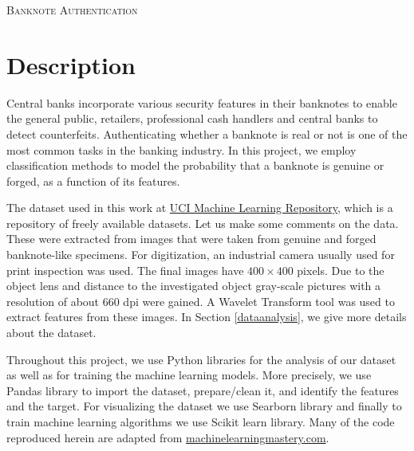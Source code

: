 \documentclass[a4paper,11pt]{amsart}
\begin{document}
\begin{tcolorbox}[center,colback=white]
\begin{center}
{\large\textsc{Banknote Authentication}}\\
\end{center}
\end{tcolorbox}

\section{Description}

Central banks incorporate various security features in their banknotes to enable
the general public, retailers, professional cash handlers and central banks to detect
counterfeits. Authenticating whether a banknote is real or not is one of the most common tasks in the banking industry. In this project, we employ classification methods to model the probability that a banknote is genuine or forged, as a function of its features.

\medbreak 

The dataset used in this work at \href{https://archive.ics.uci.edu/ml/datasets/banknote+authentication}{UCI Machine Learning Repository}, which is a repository of freely available datasets. Let us make some comments on the data. These were extracted from images that were taken from genuine and forged banknote-like specimens. For digitization, an industrial camera usually used for print inspection was used. The final images have $400\times400$ pixels. Due to the object lens and distance to the investigated object gray-scale pictures with a resolution of about $660$ dpi were gained. A Wavelet Transform tool was used to extract features from these images. In Section \ref{dataanalysis}, we give more details about the dataset.

\medbreak

Throughout this project, we use Python libraries for the analysis of our dataset as well as for training the machine learning models. More precisely, we use Pandas library to import the dataset, prepare/clean it, and identify the features and the target. For visualizing the dataset we use Searborn library and finally to train machine learning algorithms we use Scikit learn library. Many of the code reproduced herein are adapted from \href{https://machinelearningmastery.com/}{machinelearningmastery.com}.

\medbreak
\end{document}
